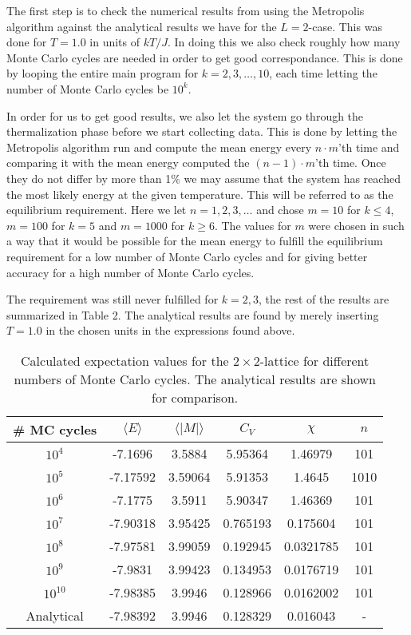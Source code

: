 \documentclass[english, 12pt]{article}
\begin{document}
The first step is to check the numerical results from using the Metropolis algorithm against the analytical results we have for the $L=2$-case. This was done for $T=1.0$ in units of $kT/J$. In doing this we also check roughly how many Monte Carlo cycles are needed in order to get good correspondance. This is done by looping the entire main program for $k = 2,3,\dots,10$, each time letting the number of Monte Carlo cycles be $10^k$.

In order for us to get good results, we also let the system go through the thermalization phase before we start collecting data. This is done by letting the Metropolis algorithm run and compute the mean energy every $n\cdot m$'th time and comparing it with the mean energy computed the $(n-1)\cdot m$'th time. Once they do not differ by more than 1\% we may assume that the system has reached the most likely energy at the given temperature. This will be referred to as the equilibrium requirement. Here we let $n=1,2,3,\dots$ and chose $m=10$ for $k\leq 4$, $m=100$ for $k=5$ and $m=1000$ for $k\geq 6$. The values for $m$ were chosen in such a way that it would be possible for the mean energy to fulfill the equilibrium requirement for a low number of Monte Carlo cycles and for giving better accuracy for a high number of Monte Carlo cycles.

The requirement was still never fulfilled for $k=2,3$, the rest of the results are summarized in Table 2. The analytical results are found by merely inserting $T = 1.0$ in the chosen units in the expressions found above.

\begin{table}[hbt!]
\centering
\begin{tabular}{|c|c|c|c|c|c|}
 \# MC cycles & $\langle E\rangle $ & $\langle |M|\rangle$ & $C_V$ & $\chi$ & $n$ \\ \hline
$10^4$  &  -7.1696      &  3.5884  &  5.95364       &   1.46979 & 101\\
$10^5$  &  -7.17592     &   3.59064 &   5.91353     &    1.4645 & 1010\\
$10^6$  &  -7.1775     &   3.5911   & 5.90347       &   1.46369 & 101\\
$10^7$  &  -7.90318   &     3.95425 &   0.765193    &      0.175604 & 101\\
$10^8$  &  -7.97581  &     3.99059  &  0.192945     &     0.0321785 & 101\\
$10^9$  &  -7.9831  &      3.99423  &  0.134953       &   0.0176719 & 101\\
$10^{10}$  &  -7.98385 &       3.9946 &   0.128966   &      0.0162002 & 101\\ \hline
Analytical &  -7.98392 & 3.9946 & 0.128329 & 0.016043 & - \\ \hline
\end{tabular}
\caption{Calculated expectation values for the $2\times2$-lattice for different numbers of Monte Carlo cycles. The analytical results are shown for comparison.}
\end{table}
\end{document}
